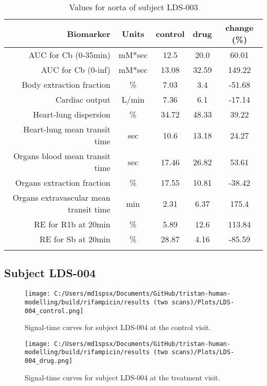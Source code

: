 \documentclass{epflreport}%
\begin{document}
\begin{longtable}{rcccc}%
\hline%
Biomarker&Units&control&drug&change (\%)\\%
\hline%
AUC for Cb (0{-}35min)&mM*sec&12.5&20.0&60.01\\%
AUC for Cb (0{-}inf)&mM*sec&13.08&32.59&149.22\\%
Body extraction fraction&\%&7.03&3.4&{-}51.68\\%
Cardiac output&L/min&7.36&6.1&{-}17.14\\%
Heart{-}lung dispersion&\%&34.72&48.33&39.22\\%
Heart{-}lung mean transit time&sec&10.6&13.18&24.27\\%
Organs blood mean transit time&sec&17.46&26.82&53.61\\%
Organs extraction fraction&\%&17.55&10.81&{-}38.42\\%
Organs extravascular mean transit time&min&2.31&6.37&175.4\\%
RE for R1b at 20min&\%&5.89&12.6&113.84\\%
RE for Sb at 20min&\%&28.87&4.16&{-}85.59\\%
\hline%
\caption{Values for aorta of subject LDS-003} \\%
\end{longtable}%
\clearpage%
\subsection{Subject LDS{-}004}%
\label{subsec:SubjectLDS{-}004}%

%


\begin{figure}[h!]%
\centering%
\texttt{[image: C:/Users/md1spsx/Documents/GitHub/tristan-human-modelling/build/rifampicin/results (two scans)/Plots/LDS-004\_control.png]}%
\caption{Signal{-}time curves for subject LDS{-}004 at the control visit.}%
\end{figure}

%


\begin{figure}[h!]%
\centering%
\texttt{[image: C:/Users/md1spsx/Documents/GitHub/tristan-human-modelling/build/rifampicin/results (two scans)/Plots/LDS-004\_drug.png]}%
\caption{Signal{-}time curves for subject LDS{-}004 at the treatment visit.}%
\end{figure}
\end{document}
